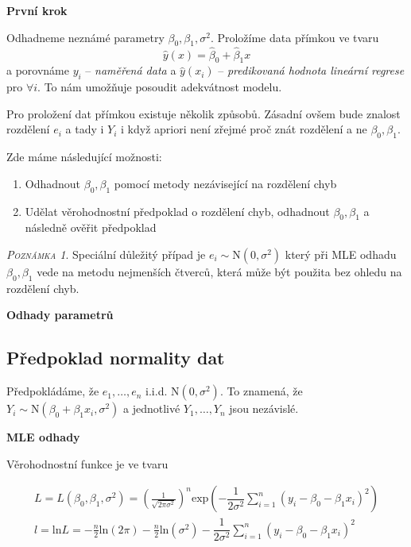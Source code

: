 \documentclass[oneside,intlimits,reqno]{scrbook}
\theoremstyle{definition}
\theoremstyle{plain}
\theoremstyle{remark}
\newtheorem{remark}[define]{\textsc{Poznámka}}
\begin{document}
\textbf{První krok }

Odhadneme neznámé parametry $ \beta_{0}, \beta_{1}, \sigma^{2} $. Proložíme data přímkou ve tvaru
\begin{equation}\label{eq:lin_reg_model}
	\widehat{y}(x) = \widehat{\beta}_{0} + \widehat{\beta}_{1} x 
\end{equation}
a porovnáme $ y_{i} $ -- \textit{naměřená data} a $ \widehat{y}(x_{i}) $ -- \textit{predikovaná hodnota lineární regrese} pro $ \forall i $. To nám umožňuje posoudit adekvátnost modelu.

Pro proložení dat přímkou existuje několik způsobů. Zásadní ovšem bude znalost rozdělení $ e_{i} $ a tady i $ Y_{i} $ i když apriori není zřejmé proč znát rozdělení a ne $ \beta_{0}, \beta_{1} $.

Zde máme následující možnosti:

\begin{enumerate}
  \item Odhadnout $ \beta_{0} , \beta_{1} $ pomocí metody nezávisející na rozdělení chyb
  \item Udělat věrohodnostní předpoklad o rozdělení chyb, odhadnout $ \beta_{0} , \beta_{1} $ a následně ověřit předpoklad
\end{enumerate}


\begin{remark}
 Speciální důležitý případ je $ e_{i} \sim \text{N}(0,\sigma^{2}) $ který při MLE odhadu $ \beta_{0}, \beta_{1} $ vede na metodu nejmenších čtverců, která může být použita bez ohledu na rozdělení chyb.
\end{remark}

\textbf{Odhady parametrů}
\subsection{Předpoklad normality dat}
Předpokládáme, že $ e_{1}, \dots , e_{n} $ i.i.d. $ \text{N}(0,\sigma^{2}) $. To znamená, že $ Y_{i} \sim \text{N}(\beta_{0} + \beta_{1} x_{i},\sigma^{2}) $ a jednotlivé $ Y_{1}, \dots , Y_{n} $ jsou nezávislé.

\textbf{MLE odhady}

Věrohodnostní funkce je ve tvaru

\begin{equation}
\begin{aligned}
	L = L ( \beta_{0} , \beta_{1} , \sigma^{2} ) = \left( \frac{1}{ \sqrt{ 2 \pi \sigma^{2} }} \right) ^{n} \text{exp} \left( - \dfrac{1}{2 \sigma^{2} } \sum_{i = 1}^{n}( y_{i} -  \beta_{0}  - \beta_{1} x_{i} )^{2} \right) \\
l = \text{ln} L = -\frac{n}{2} \text{ln} ( 2 \pi ) -\frac{n}{2} \text{ln} (\sigma^{2} ) - \dfrac{1}{2 \sigma^{2} } \sum_{i = 1}^{n}( y_{i} -  \beta_{0}  - \beta_{1} x_{i})^{2}
\end{aligned}
\end{equation}
\end{document}
